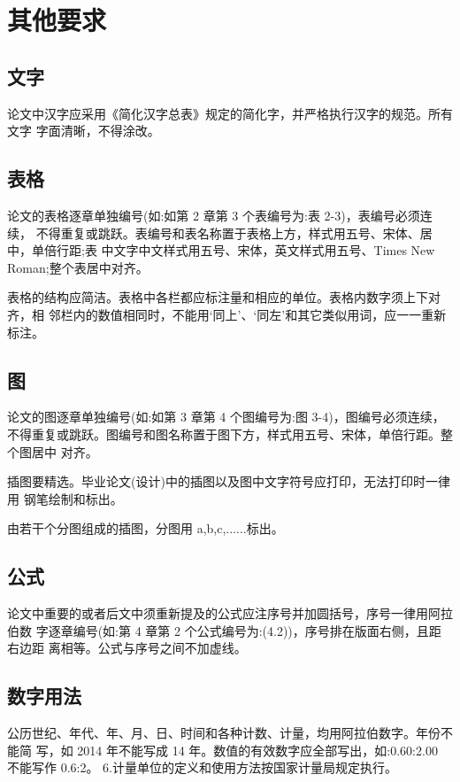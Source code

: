 \chapter{其他要求}
 
\section{文字}

论文中汉字应采用《简化汉字总表》规定的简化字，并严格执行汉字的规范。所有文字 字面清晰，不得涂改。

\section{表格}
论文的表格逐章单独编号(如:如第 2 章第 3 个表编号为:表 2-3)，表编号必须连续， 不得重复或跳跃。表编号和表名称置于表格上方，样式用五号、宋体、居中，单倍行距;表 中文字中文样式用五号、宋体，英文样式用五号、Times New Roman;整个表居中对齐。

表格的结构应简洁。表格中各栏都应标注量和相应的单位。表格内数字须上下对齐，相 邻栏内的数值相同时，不能用‘同上’、‘同左’和其它类似用词，应一一重新标注。
\section{图}

论文的图逐章单独编号(如:如第 3 章第 4 个图编号为:图 3-4)，图编号必须连续， 不得重复或跳跃。图编号和图名称置于图下方，样式用五号、宋体，单倍行距。整个图居中 对齐。

插图要精选。毕业论文(设计)中的插图以及图中文字符号应打印，无法打印时一律用 钢笔绘制和标出。

由若干个分图组成的插图，分图用 a,b,c,......标出。
\section{公式}

论文中重要的或者后文中须重新提及的公式应注序号并加圆括号，序号一律用阿拉伯数
字逐章编号(如:第 4 章第 2 个公式编号为:(4.2))，序号排在版面右侧，且距右边距 离相等。公式与序号之间不加虚线。
\section{数字用法}

公历世纪、年代、年、月、日、时间和各种计数、计量，均用阿拉伯数字。年份不能简
写，如 2014 年不能写成 14 年。数值的有效数字应全部写出，如:0.60:2.00 不能写作 0.6:2。 6.计量单位的定义和使用方法按国家计量局规定执行。

